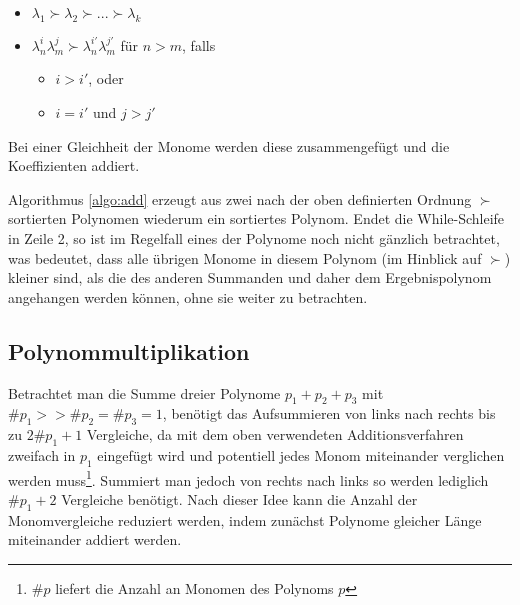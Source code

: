 \begin{itemize}
    \label{def:order}
    \item $\lambda_1 \succ \lambda_2 \succ...\succ \lambda_k $
    \item $\lambda_n^i \lambda_m^j \succ \lambda_n^{i'} \lambda_m^{j'} $ für $n > m$, falls
    \begin{itemize}
        \item[] $ i > i'$, oder
        \item[] $ i = i'$ und $ j > j'$
    \end{itemize}
\end{itemize}
Bei einer Gleichheit der Monome werden diese zusammengefügt und die Koeffizienten addiert.

Algorithmus \ref{algo:add} erzeugt aus zwei nach der oben definierten Ordnung $\succ$ sortierten Polynomen wiederum ein sortiertes Polynom. Endet die While-Schleife in Zeile 2, so ist im Regelfall eines der Polynome noch nicht gänzlich betrachtet, was bedeutet, dass alle übrigen Monome in diesem Polynom (im Hinblick auf $\succ$) kleiner sind, als die des anderen Summanden und daher dem Ergebnispolynom angehangen werden können, ohne sie weiter zu betrachten. 

\subsection{Polynommultiplikation}


Betrachtet man die Summe dreier Polynome $p_1 + p_2 + p_3$ mit $\#p_1 >> \#p_2 = \#p_3 = 1$, benötigt das Aufsummieren von links nach rechts bis zu $2\#p_1 + 1$ Vergleiche, da mit dem oben verwendeten Additionsverfahren zweifach in $p_1$ eingefügt wird und potentiell jedes Monom miteinander verglichen werden muss\footnote{$\#p$ liefert die Anzahl an Monomen des Polynoms $p$}. Summiert man jedoch von rechts nach links so werden lediglich $\#p_1 + 2$ Vergleiche benötigt. Nach dieser Idee kann die Anzahl der Monomvergleiche reduziert werden, indem zunächst Polynome gleicher Länge miteinander addiert werden. 


